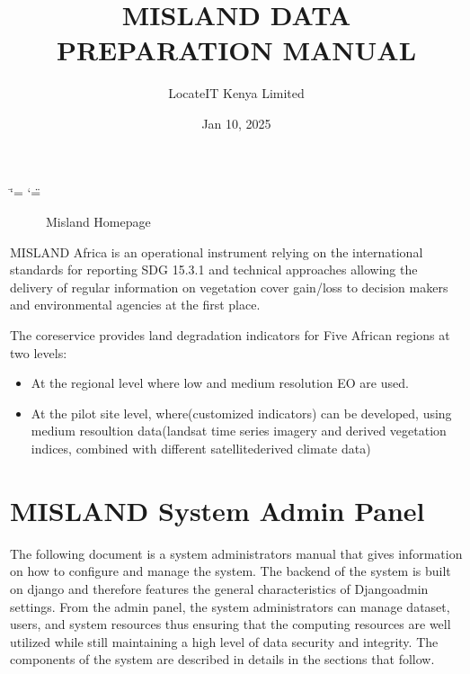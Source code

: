 \documentclass[letterpaper,10pt,english]{sphinxmanual}
\title{MISLAND DATA PREPARATION MANUAL}
\date{Jan 10, 2025}
\author{LocateIT Kenya Limited}
\let\sphinxpxdimen\pdfpxdimen\else\newdimen\sphinxpxdimen
\begin{document}
\ifdefined\shorthandoff
  \ifnum\catcode`\=\string=\active\shorthandoff{=}\fi
  \ifnum\catcode`\"=\active{}\fi
\fi

\pagestyle{empty}
\sphinxmaketitle
\pagestyle{plain}
\sphinxtableofcontents
\pagestyle{normal}
\label{\detokenize{index::doc}}


\begin{figure}[H]
\centering
\capstart

\noindent\sphinxincludegraphics[width=800\sphinxpxdimen,height=400\sphinxpxdimen]{{intro11}.png}
\caption{Misland Homepage}\label{\detokenize{index:id1}}\end{figure}

\sphinxAtStartPar
MISLAND Africa is an operational instrument relying on the international standards for reporting SDG 15.3.1 and technical approaches allowing the delivery of regular information on vegetation cover gain/loss to decision makers and environmental agencies at the first place.

\sphinxAtStartPar
The core\sphinxhyphen{}service provides land degradation indicators for Five African regions at two levels:
\begin{itemize}
\item {} 
\sphinxAtStartPar
At the regional level where low and medium resolution EO are used.

\item {} 
\sphinxAtStartPar
At the pilot site level, where(customized indicators) can be developed, using medium resoultion data(landsat time series imagery and derived vegetation indices, combined with different satellite\sphinxhyphen{}derived climate data)

\end{itemize}

\sphinxstepscope


\chapter{MISLAND System Admin Panel}
\label{\detokenize{Introduction/admin:misland-system-admin-panel}}\label{\detokenize{Introduction/admin::doc}}
\sphinxAtStartPar
The following document is a system administrators manual that gives information on how to configure and manage the system. The backend of the system is built on django and therefore features the general characteristics of Django\sphinxhyphen{}admin settings. From the admin panel, the system administrators can manage dataset, users, and system resources thus ensuring that the computing resources are well utilized while still maintaining a high level of data security and integrity. The components of the system are described in details in the sections that follow.
\end{document}
